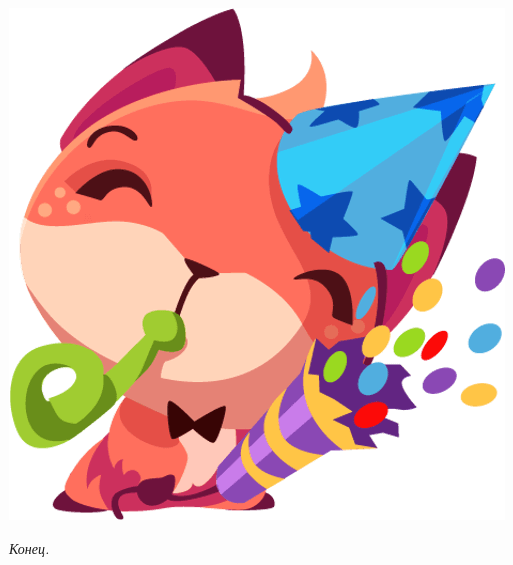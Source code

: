 \vspace*{\fill}
\centerline{
\includegraphics[height=0.3\textheight]{pictures/Foxi/theend}}
\begin{center}
\Large\textit{Конец.}
\end{center}
\vspace*{\fill}